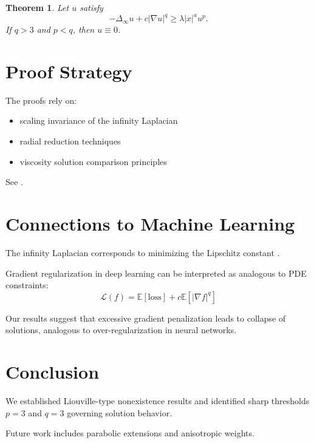 \documentclass[11pt, a4paper]{article}
\theoremstyle{plain}
\newtheorem{theorem}{Theorem}[section]
\theoremstyle{definition}
\theoremstyle{remark}
\begin{document}
\begin{theorem}
Let $u$ satisfy
\[
-\Delta_\infty u + c|\nabla u|^q \ge \lambda |x|^a u^p.
\]
If $q > 3$ and $p < q$, then $u \equiv 0$.
\end{theorem}

\section{Proof Strategy}

The proofs rely on:
\begin{itemize}
\item scaling invariance of the infinity Laplacian
\item radial reduction techniques
\item viscosity solution comparison principles
\end{itemize}

See \cite{crandall1992, crandall2001, peres2009}.

\section{Connections to Machine Learning}

The infinity Laplacian corresponds to minimizing the Lipschitz constant \cite{crandall2001}. 

Gradient regularization in deep learning \cite{finlay2018, gao2022} can be interpreted as analogous to PDE constraints:
\[
\mathcal{L}(f) = \mathbb{E}[\text{loss}] + c \mathbb{E}[|\nabla f|^q]
\]

Our results suggest that excessive gradient penalization leads to collapse of solutions, analogous to over-regularization in neural networks.

\section{Conclusion}

We established Liouville-type nonexistence results and identified sharp thresholds $p=3$ and $q=3$ governing solution behavior.

Future work includes parabolic extensions and anisotropic weights.



\end{document}
